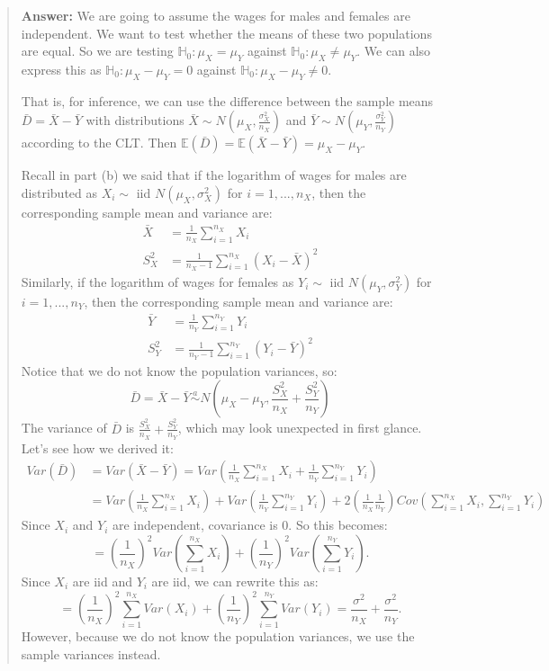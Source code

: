 \documentclass[
]{article}
\begin{document}
\begin{quote}
\textbf{Answer:} We are going to assume the wages for males and females
are independent. We want to test whether the means of these two
populations are equal. So we are testing \(\mathbb{H}_0: \mu_X = \mu_Y\)
against \(\mathbb{H}_0: \mu_X \neq \mu_Y\). We can also express this as
\(\mathbb{H}_0: \mu_X - \mu_Y = 0\) against
\(\mathbb{H}_0: \mu_X - \mu_Y \neq 0.\)

That is, for inference, we can use the difference between the sample
means \(\bar D = \bar X - \bar Y\) with distributions
\(\bar X \sim N(\mu_X, \frac{\sigma^2_X}{n_X})\) and
\(\bar Y \sim N(\mu_Y,\frac{\sigma^2_Y}{n_Y})\) according to the CLT.
Then
\(\mathbb{E}(\bar{D}) = \mathbb{E}(\bar{X} - \bar{Y}) = \mu_X - \mu_Y.\)

Recall in part (b) we said that if the logarithm of wages for males are
distributed as \(X_i \sim\) iid \(N(\mu_X, \sigma_X^2)\) for
\(i=1,...,n_X\), then the corresponding sample mean and variance are: \[
\begin{aligned}
\bar X &= \frac{1}{n_X}\displaystyle\sum_{i=1}^{n_X}X_i
\\
S_X^2 &= \frac{1}{n_X-1}\displaystyle\sum_{i=1}^{n_X}(X_i - \bar X)^2
\end{aligned}
\] Similarly, if the logarithm of wages for females as \(Y_i \sim\) iid
\(N(\mu_Y, \sigma_Y^2)\) for \(i=1,...,n_Y\), then the corresponding
sample mean and variance are: \[
\begin{aligned}
\bar Y &= \frac{1}{n_Y}\displaystyle\sum_{i=1}^{n_Y}Y_i
\\
S_Y^2 &= \frac{1}{n_{Y}-1}\displaystyle\sum_{i=1}^{n_Y}(Y_i - \bar Y)^2
\end{aligned}
\] Notice that we do not know the population variances, so: \[
\bar D = \bar X - \bar Y \overset{a}{\sim} N\left(\mu_X - \mu_Y, \frac{S^2_X}{n_X} + \frac{S^2_Y}{n_Y}\right)
\] The variance of \(\bar D\) is
\(\frac{S^2_X}{n_X} + \frac{S^2_Y}{n_Y}\), which may look unexpected in
first glance. Let's see how we derived it: \[
\begin{aligned}
Var(\bar D) &= Var(\bar X - \bar Y) = Var\left(\frac{1}{n_X}\displaystyle\sum_{i=1}^{n_X}X_i + \frac{1}{n_Y}\displaystyle\sum_{i=1}^{n_Y}Y_i\right) 
\\
&= Var\left(\frac{1}{n_X}\displaystyle\sum_{i=1}^{n_X}X_i\right) + Var\left(\frac{1}{n_Y}\displaystyle\sum_{i=1}^{n_Y}Y_i\right)+2\left(\frac{1}{n_X}\frac{1}{n_Y}\right)Cov\left(\displaystyle\sum_{i=1}^{n_X}X_i , \displaystyle\sum_{i=1}^{n_Y}Y_i\right)
\end{aligned}
\] Since \(X_i\) and \(Y_i\) are independent, covariance is 0. So this
becomes: \[
=\left(\frac{1}{n_X}\right)^2 Var\left(\displaystyle\sum_{i=1}^{n_X}X_i\right) + \left(\frac{1}{n_Y}\right)^2 Var\left(\displaystyle\sum_{i=1}^{n_Y}Y_i\right).
\] Since \(X_i\) are iid and \(Y_i\) are iid, we can rewrite this as: \[
=\left(\frac{1}{n_X}\right)^2\displaystyle\sum_{i=1}^{n_X}Var(X_i) + \left(\frac{1}{n_Y}\right)^2\displaystyle\sum_{i=1}^{n_Y}Var(Y_i) = \frac{\sigma^2}{n_X}+\frac{\sigma^2}{n_Y}.
\] However, because we do not know the population variances, we use the
sample variances instead.


\end{quote}
\end{document}
